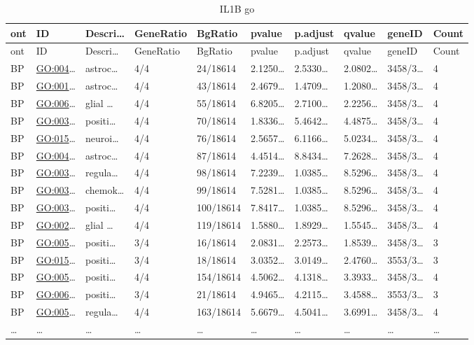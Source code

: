 \documentclass[
]{article}
\begin{document}
\begin{longtable}[]{@{}llllllllll@{}}
\caption{\label{tab:IL1B-go}IL1B go}\tabularnewline
\toprule
ont & ID & Descri\ldots{} & GeneRatio & BgRatio & pvalue & p.adjust & qvalue & geneID & Count\tabularnewline
\midrule
\endfirsthead
\toprule
ont & ID & Descri\ldots{} & GeneRatio & BgRatio & pvalue & p.adjust & qvalue & geneID & Count\tabularnewline
\midrule
\endhead
BP & \url{GO:004}\ldots{} & astroc\ldots{} & 4/4 & 24/18614 & 2.1250\ldots{} & 2.5330\ldots{} & 2.0802\ldots{} & 3458/3\ldots{} & 4\tabularnewline
BP & \url{GO:001}\ldots{} & astroc\ldots{} & 4/4 & 43/18614 & 2.4679\ldots{} & 1.4709\ldots{} & 1.2080\ldots{} & 3458/3\ldots{} & 4\tabularnewline
BP & \url{GO:006}\ldots{} & glial \ldots{} & 4/4 & 55/18614 & 6.8205\ldots{} & 2.7100\ldots{} & 2.2256\ldots{} & 3458/3\ldots{} & 4\tabularnewline
BP & \url{GO:003}\ldots{} & positi\ldots{} & 4/4 & 70/18614 & 1.8336\ldots{} & 5.4642\ldots{} & 4.4875\ldots{} & 3458/3\ldots{} & 4\tabularnewline
BP & \url{GO:015}\ldots{} & neuroi\ldots{} & 4/4 & 76/18614 & 2.5657\ldots{} & 6.1166\ldots{} & 5.0234\ldots{} & 3458/3\ldots{} & 4\tabularnewline
BP & \url{GO:004}\ldots{} & astroc\ldots{} & 4/4 & 87/18614 & 4.4514\ldots{} & 8.8434\ldots{} & 7.2628\ldots{} & 3458/3\ldots{} & 4\tabularnewline
BP & \url{GO:003}\ldots{} & regula\ldots{} & 4/4 & 98/18614 & 7.2239\ldots{} & 1.0385\ldots{} & 8.5296\ldots{} & 3458/3\ldots{} & 4\tabularnewline
BP & \url{GO:003}\ldots{} & chemok\ldots{} & 4/4 & 99/18614 & 7.5281\ldots{} & 1.0385\ldots{} & 8.5296\ldots{} & 3458/3\ldots{} & 4\tabularnewline
BP & \url{GO:003}\ldots{} & positi\ldots{} & 4/4 & 100/18614 & 7.8417\ldots{} & 1.0385\ldots{} & 8.5296\ldots{} & 3458/3\ldots{} & 4\tabularnewline
BP & \url{GO:002}\ldots{} & glial \ldots{} & 4/4 & 119/18614 & 1.5880\ldots{} & 1.8929\ldots{} & 1.5545\ldots{} & 3458/3\ldots{} & 4\tabularnewline
BP & \url{GO:005}\ldots{} & positi\ldots{} & 3/4 & 16/18614 & 2.0831\ldots{} & 2.2573\ldots{} & 1.8539\ldots{} & 3458/3\ldots{} & 3\tabularnewline
BP & \url{GO:015}\ldots{} & positi\ldots{} & 3/4 & 18/18614 & 3.0352\ldots{} & 3.0149\ldots{} & 2.4760\ldots{} & 3553/3\ldots{} & 3\tabularnewline
BP & \url{GO:005}\ldots{} & positi\ldots{} & 4/4 & 154/18614 & 4.5062\ldots{} & 4.1318\ldots{} & 3.3933\ldots{} & 3458/3\ldots{} & 4\tabularnewline
BP & \url{GO:006}\ldots{} & positi\ldots{} & 3/4 & 21/18614 & 4.9465\ldots{} & 4.2115\ldots{} & 3.4588\ldots{} & 3553/3\ldots{} & 3\tabularnewline
BP & \url{GO:005}\ldots{} & regula\ldots{} & 4/4 & 163/18614 & 5.6679\ldots{} & 4.5041\ldots{} & 3.6991\ldots{} & 3458/3\ldots{} & 4\tabularnewline
\ldots{} & \ldots{} & \ldots{} & \ldots{} & \ldots{} & \ldots{} & \ldots{} & \ldots{} & \ldots{} & \ldots{}\tabularnewline
\bottomrule
\end{longtable}
\end{document}
